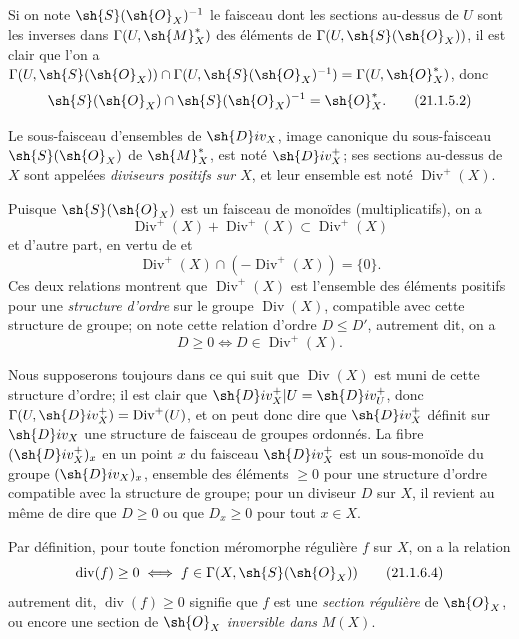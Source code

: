 
Si on note $\sh{S}(\sh{O}_X)^{-1}$ le faisceau dont les sections au-dessus de $U$ sont les inverses dans $\Gamma(U,\sh{M}_X^*)$ des éléments de $\Gamma(U,\sh{S}(\sh{O}_X))$, il est clair que l'on a $\Gamma(U,\sh{S}(\sh{O}_X))\cap\Gamma(U,\sh{S}(\sh{O}_X)^{-1})=\Gamma(U,\sh{O}_X^*)$, donc
\[
\label{IV.21.1.5.2}
  \sh{S}(\sh{O}_X)\cap\sh{S}(\sh{O}_X)^{-1}=\sh{O}_X^*.
  \tag{21.1.5.2}
\]

\begin{definition}[21.1.6]
Le sous-faisceau d'ensembles de $\sh{D}iv_X$, image canonique du sous-faisceau $\sh{S}(\sh{O}_X)$ de $\sh{M}_X^*$, est noté $\sh{D}iv_X^+$; ses sections au-dessus de $X$ sont appelées \emph{diviseurs positifs sur $X$}, et leur ensemble est noté $\operatorname{Div}^+(X)$.
\end{definition}

Puisque $\sh{S}(\sh{O}_X)$ est un faisceau de monoïdes (multiplicatifs), on a
\[
\label{IV.21.1.6.1}
  \operatorname{Div}^+(X)+\operatorname{Div}^+(X)\subset\operatorname{Div}^+(X)
  \tag{21.1.6.1}
\]
et d'autre part, en vertu de  et 
\[
\label{IV.21.1.6.2}
  \operatorname{Div}^+(X)\cap(-\operatorname{Div}^+(X))=\{0\}.
  \tag{21.1.6.2}
\]
Ces deux relations montrent que $\operatorname{Div}^+(X)$ est l'ensemble des éléments positifs pour une \emph{structure d'ordre} sur le groupe $\operatorname{Div}(X)$, compatible avec cette structure de groupe; on note cette relation d'ordre $D\leq D'$, autrement dit, on a
\[
\label{IV.21.1.6.3}
  D\geq0 \iff D\in\operatorname{Div}^+(X).
  \tag{21.1.6.3}
\]

Nous supposerons toujours dans ce qui suit que $\operatorname{Div}(X)$ est muni de cette structure d'ordre;
il est clair que $\sh{D}iv_X^+|U=\sh{D}iv_U^+$, donc $\Gamma(U,\sh{D}iv_X^+)=\operatorname{Div}^+(U)$, et on peut donc dire que $\sh{D}iv_X^+$ définit sur $\sh{D}iv_X$ une structure de faisceau de groupes ordonnés.
La fibre $(\sh{D}iv_X^+)_x$ en un point $x$ du faisceau $\sh{D}iv_X^+$ est un sous-monoïde du groupe $(\sh{D}iv_X)_x$, ensemble des éléments $\geq0$ pour une structure d'ordre compatible avec la structure de groupe;
pour un diviseur $D$ sur $X$, il revient au même de dire que $D\geq0$ ou que $D_x\geq0$ pour tout $x\in X$.

Par définition, pour toute fonction méromorphe régulière $f$ sur $X$, on a la relation
\[
\label{IV.21.1.6.4}
  \operatorname{div}(f)\geq0 \iff f\in\Gamma(X,\sh{S}(\sh{O}_X))
  \tag{21.1.6.4}
\]
autrement dit, $\operatorname{div}(f)\geq0$ signifie que $f$ est une \emph{section régulière} de $\sh{O}_X$, ou encore une section de $\sh{O}_X$ \emph{inversible dans} $M(X)$.

